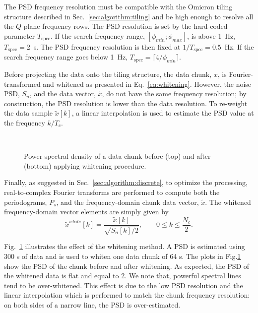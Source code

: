 The PSD frequency resolution must be compatible with the Omicron tiling structure described in Sec.~\ref{sec:algorithm:tiling} and be high enough to resolve all the $Q$ plane frequency rows. The PSD resolution is set by the hard-coded parameter $T_\mathrm{spec}$. If the search frequency range, $[\phi_{min}; \phi_{max}]$, is above 1~Hz, $T_\mathrm{spec}=2$~s. The PSD frequency resolution is then fixed at $1/T_\mathrm{spec}=0.5$~Hz. If the search frequency range goes below 1~Hz, $T_\mathrm{spec}=\lceil4/\phi_{min}\rceil$.

Before projecting the data onto the tiling structure, the data chunk, $x$, is Fourier-transformed and whitened as presented in Eq.~\ref{eq:whitening}. However, the noise PSD, $S_n$, and the data vector, $\tilde{x}$, do not have the same frequency resolution; by construction, the PSD resolution is lower than the data resolution.  To re-weight the data sample $\tilde{x}[k]$, a linear interpolation is used to estimate the PSD value at the frequency $k/T_c$.
\begin{figure}
  \center
   \\
  \caption{Power spectral density of a data chunk before (top) and after (bottom) applying whitening procedure.}
  \label{fig:white}
\end{figure}

Finally, as suggested in Sec.~\ref{sec:algorithm:discrete}, to optimize the processing, real-to-complex Fourier transforms are performed to compute both the periodograms, $P_s$, and the frequency-domain chunk data vector, $\tilde{x}$. The whitened frequency-domain vector elements are simply given by
\begin{equation}
  \tilde{x}^{white}[k] = \frac{\tilde{x}[k]}{\sqrt{S_n[k]/2}}, \qquad 0 \le k \le \frac{N_c}{2}.
\end{equation}

Fig.~\ref{fig:white} illustrates the effect of the whitening method. A PSD is estimated using 300 s of data and is used to whiten one data chunk of 64 s. The plots in Fig.\ref{fig:white} show the PSD of the chunk before and after whitening. As expected, the PSD of the whitened data is flat and equal to 2. We note that, powerful spectral lines tend to be over-whitened. This effect is due to the low PSD resolution and the linear interpolation which is performed to match the chunk frequency resolution: on both sides of a narrow line, the PSD is over-estimated.



